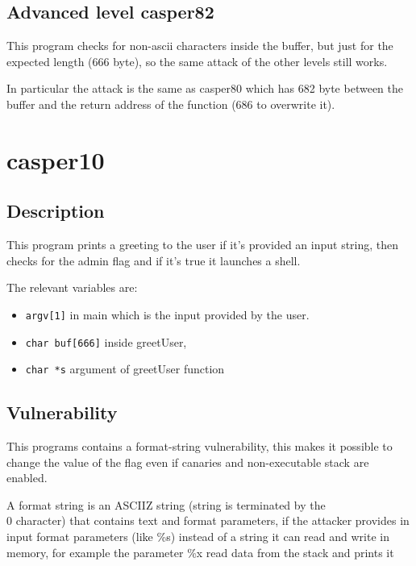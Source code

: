 \documentclass[a4paper,12pt]{article}
\begin{document}
\subsection{Advanced level casper82}

This program checks for non-ascii characters inside the buffer, but just for the expected length (666 byte), so the same attack of the other levels still works.

In particular the attack is the same as casper80 which has 682 byte between the buffer and the return address of the function (686 to overwrite it).


\section{casper10}

\subsection{Description}
This program prints a greeting to the user if it's provided an input string, then checks for the admin flag and if it's true it launches a shell. 

The relevant variables are:
\begin{itemize}

\item \texttt{argv[1]} in main which is the input provided by the user.
\item \texttt{char buf[666]} inside greetUser,
\item \texttt{char *s} argument of greetUser function

\end{itemize}


\subsection{Vulnerability}

This programs contains a format-string vulnerability, this makes it possible to change the value of the flag even if canaries and non-executable stack are enabled.

A format string is an ASCIIZ string (string is terminated by the \\0 character) that contains text and format parameters, if the attacker provides in input format parameters (like \%s) instead of a string it can read and write in memory, for example the parameter \%x read data from the stack and prints it %
\end{document}
